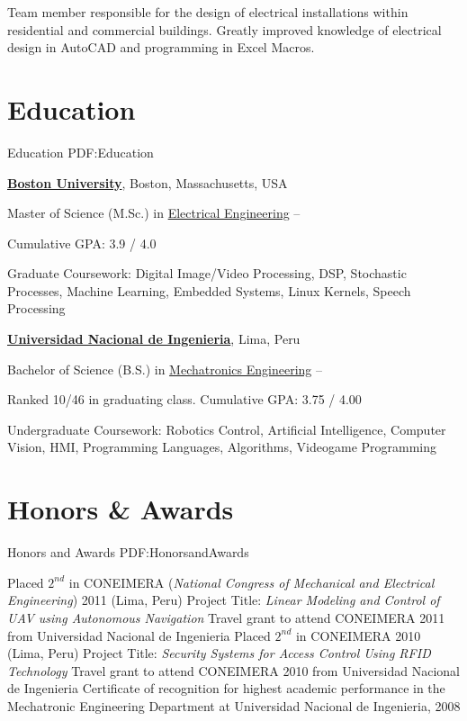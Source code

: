 \documentclass[letterpaper,MMMyyyy,nonstop]{simpleresumecv}
\begin{document}
\begin{body}
\GapNoBreak
\BulletItem
Team member responsible for the design of electrical installations within residential and commercial buildings.
\BulletItem
Greatly improved knowledge of electrical design in AutoCAD and programming in Excel Macros.


\section
{Education}
{Education}
{PDF:Education}

\href{http://www.bu.edu/}
{\textbf{Boston University}},
Boston, Massachusetts, USA

\GapNoBreak
\BulletItem
Master of Science (M.Sc.) in
\href{http://www.bu.edu/ece/}
{Electrical Engineering}
\hfill
{} --
\begin{detail}
\SubBulletItem
Cumulative GPA: 3.9 / 4.0
\end{detail}
\BulletItem
Graduate Coursework: Digital Image/Video Processing, DSP, Stochastic Processes, Machine Learning, Embedded Systems, Linux Kernels, Speech Processing

\BigGap
\href{http://www.uni.edu.pe/}
{\textbf{Universidad Nacional de Ingenieria}},
Lima, Peru

\GapNoBreak
\BulletItem
Bachelor of Science (B.S.) in
\href{http://www.fim.uni.edu.pe/}
{Mechatronics Engineering}
\hfill
{} --
\begin{detail}
\SubBulletItem
Ranked 10/46 in graduating class.
\SubBulletItem
Cumulative GPA: 3.75 / 4.00
\end{detail}
\BulletItem
Undergraduate Coursework: Robotics Control, Artificial Intelligence, Computer Vision, HMI, Programming Languages, Algorithms, Videogame Programming


\section
{Honors \newline
\& Awards}
{Honors and Awards}
{PDF:HonorsandAwards}

\GapNoBreak
\BulletItem
Placed $2^{nd}$ in CONEIMERA (\textit{National Congress of Mechanical and Electrical Engineering}) 2011 (Lima, Peru)
\SubBulletItem
Project Title: \textit{Linear Modeling and Control of UAV using Autonomous Navigation}
\GapNoBreak
\BulletItem
Travel grant to attend CONEIMERA 2011 from Universidad Nacional de Ingenieria
\GapNoBreak
\BulletItem
Placed $2^{nd}$ in CONEIMERA 2010 (Lima, Peru)
\SubBulletItem
Project Title: \textit{Security Systems for Access Control Using RFID Technology}
\GapNoBreak
\BulletItem
Travel grant to attend CONEIMERA 2010 from Universidad Nacional de Ingenieria
\GapNoBreak
\BulletItem
Certificate of recognition for highest academic performance in the Mechatronic Engineering Department at Universidad Nacional de Ingenieria, 2008


\end{body}
\end{document}
